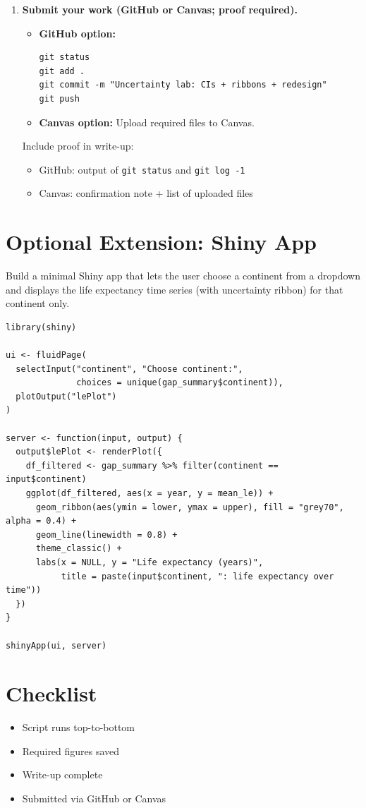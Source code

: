 \documentclass[11pt]{article}
\begin{document}
\begin{enumerate}
\item \textbf{Submit your work (GitHub or Canvas; proof required).}

\begin{itemize}
  \item \textbf{GitHub option:}
\begin{verbatim}
git status
git add .
git commit -m "Uncertainty lab: CIs + ribbons + redesign"
git push
\end{verbatim}

  \item \textbf{Canvas option:}
  Upload required files to Canvas.
\end{itemize}

Include proof in write-up:
\begin{itemize}
  \item GitHub: output of \texttt{git status} and \texttt{git log -1}
  \item Canvas: confirmation note + list of uploaded files
\end{itemize}

\end{enumerate}

\section*{Optional Extension: Shiny App}

Build a minimal Shiny app that lets the user choose a continent from a dropdown and displays the life expectancy time series (with uncertainty ribbon) for that continent only.

\begin{verbatim}
library(shiny)

ui <- fluidPage(
  selectInput("continent", "Choose continent:",
              choices = unique(gap_summary$continent)),
  plotOutput("lePlot")
)

server <- function(input, output) {
  output$lePlot <- renderPlot({
    df_filtered <- gap_summary %>% filter(continent == input$continent)
    ggplot(df_filtered, aes(x = year, y = mean_le)) +
      geom_ribbon(aes(ymin = lower, ymax = upper), fill = "grey70", alpha = 0.4) +
      geom_line(linewidth = 0.8) +
      theme_classic() +
      labs(x = NULL, y = "Life expectancy (years)",
           title = paste(input$continent, ": life expectancy over time"))
  })
}

shinyApp(ui, server)
\end{verbatim}

\section*{Checklist}
\begin{itemize}
  \item Script runs top-to-bottom
  \item Required figures saved
  \item Write-up complete
  \item Submitted via GitHub or Canvas
\end{itemize}
\end{document}
